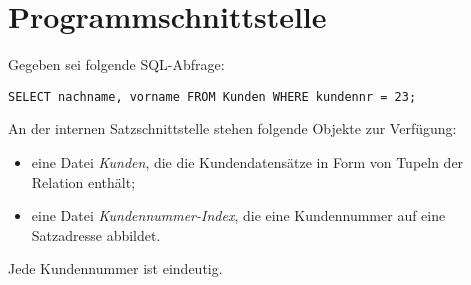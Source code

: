 \section{Programmschnittstelle}

Gegeben sei folgende SQL-Abfrage:

\texttt{SELECT nachname, vorname FROM Kunden WHERE kundennr = 23;}

An der internen Satzschnittstelle stehen folgende Objekte zur Verfügung:
\begin{itemize}
	\item eine Datei \emph{Kunden}, die die Kundendatensätze in Form von Tupeln der Relation enthält;
	\item eine Datei \emph{Kundennummer-Index}, die eine Kundennummer auf eine Satzadresse abbildet.
\end{itemize}
Jede Kundennummer ist eindeutig.

